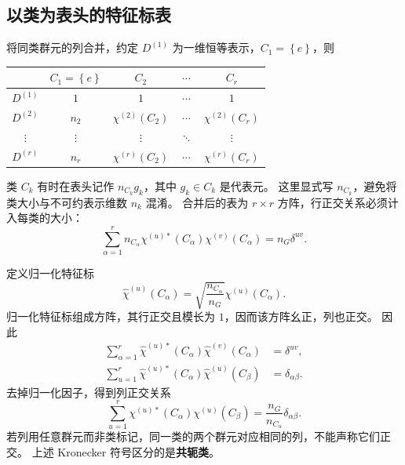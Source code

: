 \subsection{以类为表头的特征标表}
将同类群元的列合并，约定 $D^{\left(1\right)}$ 为一维恒等表示，$C_1=\left\{e\right\}$，则
\begin{center}
\begin{tabular}{c|cccc}
\toprule
 & $C_1=\left\{e\right\}$ & $C_2$ & $\cdots$ & $C_r$\\\midrule
$D^{\left(1\right)}$ & $1$ & $1$ & $\cdots$ & $1$\\
$D^{\left(2\right)}$ & $n_2$ & $\chi^{\left(2\right)}\left(C_2\right)$ & $\cdots$ & $\chi^{\left(2\right)}\left(C_r\right)$\\
$\vdots$ & $\vdots$ & $\vdots$ & $\ddots$ & $\vdots$\\
$D^{\left(r\right)}$ & $n_r$ & $\chi^{\left(r\right)}\left(C_2\right)$ & $\cdots$ & $\chi^{\left(r\right)}\left(C_r\right)$\\\bottomrule
\end{tabular}
\end{center}
类 $C_k$ 有时在表头记作 $n_{C_k}g_k$，其中 $g_k\in C_k$ 是代表元。
这里显式写 $n_{C_k}$，避免将类大小与不可约表示维数 $n_k$ 混淆。
合并后的表为 $r\times r$ 方阵，行正交关系必须计入每类的大小：
\begin{equation}
\sum_{\alpha=1}^{r}n_{C_\alpha}\chi^{\left(u\right)*}\left(C_\alpha\right)\chi^{\left(v\right)}\left(C_\alpha\right)
=n_G\delta^{uv}.
\end{equation}

定义归一化特征标
\begin{equation}
\hat\chi^{\left(u\right)}\left(C_\alpha\right)=\sqrt{\frac{n_{C_\alpha}}{n_G}}\chi^{\left(u\right)}\left(C_\alpha\right).
\end{equation}
归一化特征标组成方阵，其行正交且模长为 $1$，因而该方阵幺正，列也正交。
因此
\begin{align}
\sum_{\alpha=1}^{r}\hat\chi^{\left(u\right)*}\left(C_\alpha\right)\hat\chi^{\left(v\right)}\left(C_\alpha\right)&=\delta^{uv},\\
\sum_{u=1}^{r}\hat\chi^{\left(u\right)*}\left(C_\alpha\right)\hat\chi^{\left(u\right)}\left(C_\beta\right)&=\delta_{\alpha\beta}.
\end{align}
去掉归一化因子，得到列正交关系
\begin{equation}
\sum_{u=1}^{r}\chi^{\left(u\right)*}\left(C_\alpha\right)\chi^{\left(u\right)}\left(C_\beta\right)
=\frac{n_G}{n_{C_\alpha}}\delta_{\alpha\beta}.
\end{equation}
若列用任意群元而非类标记，同一类的两个群元对应相同的列，不能声称它们正交。
上述 Kronecker 符号区分的是\textbf{共轭类}。

